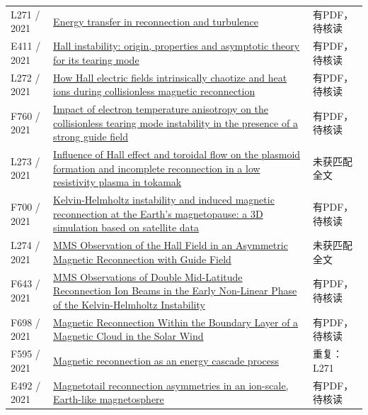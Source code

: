 \begin{longtable}{P{24mm}P{97mm}P{27mm}}
L271 / 2021 & \href{https://doi.org/10.1103/physreve.104.065206}{Energy transfer in reconnection and turbulence} & 有PDF，待核读\\

E411 / 2021 & \href{https://doi.org/10.1017/s0022377821000726}{Hall instability: origin,  properties and asymptotic theory for its tearing mode} & 有PDF，待核读\\

L272 / 2021 & \href{https://doi.org/10.1063/5.0040374}{How Hall electric fields intrinsically chaotize and heat ions during collisionless magnetic reconnection} & 有PDF，待核读\\

F760 / 2021 & \href{https://doi.org/10.1063/5.0037227}{Impact of electron temperature anisotropy on the collisionless tearing mode instability in the presence of a strong guide field} & 有PDF，待核读\\

L273 / 2021 & \href{https://doi.org/10.1088/1741-4326/ac3365}{Influence of Hall effect and toroidal flow on the plasmoid formation and incomplete reconnection in a low resistivity plasma in tokamak} & 未获匹配全文\\

F700 / 2021 & \href{https://doi.org/10.1088/1361-6587/ac43f0}{Kelvin-Helmholtz instability and induced magnetic reconnection at the Earth’s magnetopause: a 3D simulation based on satellite data} & 有PDF，待核读\\

L274 / 2021 & \href{https://doi.org/10.3847/1538-4357/ac31b1}{MMS Observation of the Hall Field in an Asymmetric Magnetic Reconnection with Guide Field} & 未获匹配全文\\

F643 / 2021 & \href{https://doi.org/10.3389/fspas.2021.760885}{MMS Observations of Double Mid-Latitude Reconnection Ion Beams in the Early Non-Linear Phase of the Kelvin-Helmholtz Instability} & 有PDF，待核读\\

F698 / 2021 & \href{https://doi.org/10.1029/2021ja029415}{Magnetic Reconnection Within the Boundary Layer of a Magnetic Cloud in the Solar Wind} & 有PDF，待核读\\

F595 / 2021 & \href{https://doi.org/10.48550/arxiv.2104.12013}{Magnetic reconnection as an energy cascade process} & 重复：L271\\

E492 / 2021 & \href{https://doi.org/10.5194/angeo-39-991-2021}{Magnetotail reconnection asymmetries in an ion-scale,  Earth-like magnetosphere} & 有PDF，待核读\\


\end{longtable}
